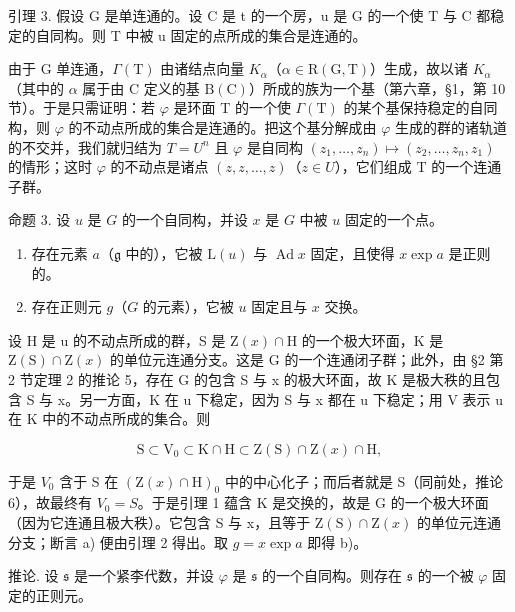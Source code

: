 引理 3. 假设 G 是单连通的。设 C 是 t 的一个房，u 是 G 的一个使 T 与 C 都稳定的自同构。则 T 中被 u 固定的点所成的集合是连通的。

由于 G 单连通，\(\varGamma(\mathrm{T})\) 由诸结点向量 \(K_{\alpha}\)（\(\alpha \in \mathrm{R}(\mathrm{G}, \mathrm{T})\)）生成，故以诸 \(K_{\alpha}\)（其中的 \(\alpha\) 属于由 C 定义的基 \(\mathrm{B}(\mathrm{C})\)）所成的族为一个基（第六章，§1，第 10 节）。于是只需证明：若 \(\varphi\) 是环面 T 的一个使 \(\varGamma(\mathrm{T})\) 的某个基保持稳定的自同构，则 \(\varphi\) 的不动点所成的集合是连通的。把这个基分解成由 \(\varphi\) 生成的群的诸轨道的不交并，我们就归结为 \(T = U^{n}\) 且 \(\varphi\) 是自同构 \((z_{1}, \ldots, z_{n}) \mapsto (z_{2}, \ldots, z_{n}, z_{1})\) 的情形；这时 \(\varphi\) 的不动点是诸点 \((z, z, \ldots, z)\)（\(z \in U\)），它们组成 T 的一个连通子群。

命题 3. 设 \(u\) 是 \(G\) 的一个自同构，并设 \(x\) 是 \(G\) 中被 \(u\) 固定的一个点。

\begin{enumerate}
\def\labelenumi{\alph{enumi})}
\item
  存在元素 \(a\)（\(\mathfrak{g}\) 中的），它被 \(\mathrm{L}(u)\) 与 \(\operatorname{Ad} x\) 固定，且使得 \(x \exp a\) 是正则的。
\item
  存在正则元 \(g\)（\(G\) 的元素），它被 \(u\) 固定且与 \(x\) 交换。
\end{enumerate}

设 H 是 u 的不动点所成的群，S 是 \(\mathrm{Z}(x)\cap\mathrm{H}\) 的一个极大环面，K 是 \(\mathrm{Z}(\mathrm{S})\cap\mathrm{Z}(x)\) 的单位元连通分支。这是 G 的一个连通闭子群；此外，由 §2 第 2 节定理 2 的推论 5，存在 G 的包含 S 与 x 的极大环面，故 K 是极大秩的且包含 S 与 x。另一方面，K 在 u 下稳定，因为 S 与 x 都在 u 下稳定；用 V 表示 u 在 K 中的不动点所成的集合。则

\[
\mathrm{S} \subset \mathrm{V} _ {0} \subset \mathrm{K} \cap \mathrm{H} \subset \mathrm{Z} (\mathrm{S}) \cap \mathrm{Z} (x) \cap \mathrm{H},
\]

于是 \(V_{0}\) 含于 S 在 \((\mathrm{Z}(x)\cap\mathrm{H})_{0}\) 中的中心化子；而后者就是 S（同前处，推论 6），故最终有 \(V_{0}=S\)。于是引理 1 蕴含 K 是交换的，故是 G 的一个极大环面（因为它连通且极大秩）。它包含 S 与 x，且等于 \(\mathrm{Z}(\mathrm{S})\cap\mathrm{Z}(x)\) 的单位元连通分支；断言 a) 便由引理 2 得出。取 \(g=x\exp a\) 即得 b)。

推论. 设 \(\mathfrak{s}\) 是一个紧李代数，并设 \(\varphi\) 是 \(\mathfrak{s}\) 的一个自同构。则存在 \(\mathfrak{s}\) 的一个被 \(\varphi\) 固定的正则元。

